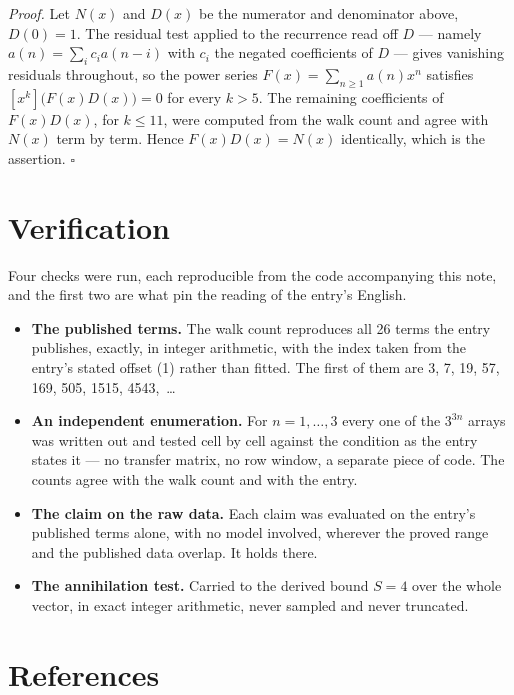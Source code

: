 \documentclass[11pt]{article}
\theoremstyle{definition}
\begin{document}
{\itshape Proof.} Let $N(x)$ and $D(x)$ be the numerator and denominator above, $D(0)=1$. The residual test applied to the recurrence read off $D$ --- namely $a(n) = \sum_i c_i a(n-i)$ with $c_i$ the negated coefficients of $D$ --- gives vanishing residuals throughout, so the power series $F(x)=\sum_{n\ge 1}a(n)x^n$ satisfies $[x^k]\bigl(F(x)D(x)\bigr) = 0$ for every $k > 5$. The remaining coefficients of $F(x)D(x)$, for $k \le 11$, were computed from the walk count and agree with $N(x)$ term by term. Hence $F(x)D(x) = N(x)$ identically, which is the assertion. $\square$

\section{Verification}

Four checks were run, each reproducible from the code accompanying this note, and the first two are what pin the reading of the entry's English.

\begin{itemize}

\item {\bfseries The published terms.} The walk count reproduces all 26 terms the entry publishes, exactly, in integer arithmetic, with the index taken from the entry's stated offset (1) rather than fitted. The first of them are 3, 7, 19, 57, 169, 505, 1515, 4543,~\dots

\item {\bfseries An independent enumeration.} For $n = 1,\dots,3$ every one of the $3^{3n}$ arrays was written out and tested cell by cell against the condition as the entry states it --- no transfer matrix, no row window, a separate piece of code. The counts agree with the walk count and with the entry.

\item {\bfseries The claim on the raw data.} Each claim was evaluated on the entry's published terms alone, with no model involved, wherever the proved range and the published data overlap. It holds there.

\item {\bfseries The annihilation test.} Carried to the derived bound $S = 4$ over the whole vector, in exact integer arithmetic, never sampled and never truncated.

\end{itemize}

\section{References}
\end{document}

